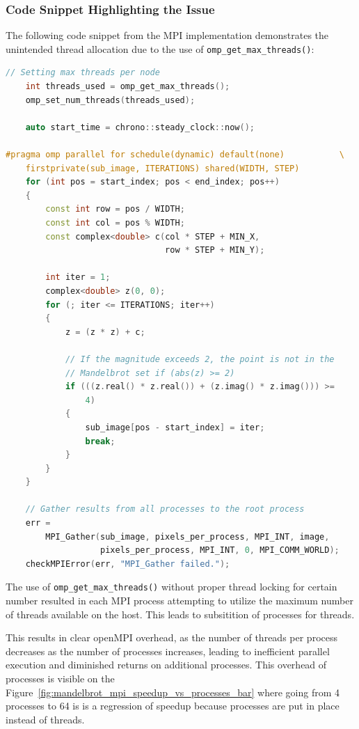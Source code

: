 \documentclass[
	report, %
	11pt, %
]{CSUniSchoolLabReport}
\newcounter{ct}
\begin{document}
\subsubsection{Code Snippet Highlighting the Issue}

The following code snippet from the MPI implementation demonstrates the unintended thread allocation due to the use of \texttt{omp\_get\_max\_threads()}:

\begin{lstlisting}[language=C++, caption={MPI Mandelbrot Kernel Launch with Thread Mismanagement}, label={lst:mandelbrot_mpi_code}]
	// Setting max threads per node
	int threads_used = omp_get_max_threads();
	omp_set_num_threads(threads_used);

	auto start_time = chrono::steady_clock::now();

#pragma omp parallel for schedule(dynamic) default(none)           \
	firstprivate(sub_image, ITERATIONS) shared(WIDTH, STEP)
	for (int pos = start_index; pos < end_index; pos++)
	{
		const int row = pos / WIDTH;
		const int col = pos % WIDTH;
		const complex<double> c(col * STEP + MIN_X,
								row * STEP + MIN_Y);

		int iter = 1;
		complex<double> z(0, 0);
		for (; iter <= ITERATIONS; iter++)
		{
			z = (z * z) + c;

			// If the magnitude exceeds 2, the point is not in the
			// Mandelbrot set if (abs(z) >= 2)
			if (((z.real() * z.real()) + (z.imag() * z.imag())) >=
				4)
			{
				sub_image[pos - start_index] = iter;
				break;
			}
		}
	}

	// Gather results from all processes to the root process
	err =
		MPI_Gather(sub_image, pixels_per_process, MPI_INT, image,
				   pixels_per_process, MPI_INT, 0, MPI_COMM_WORLD);
	checkMPIError(err, "MPI_Gather failed.");
\end{lstlisting}

The use of \texttt{omp\_get\_max\_threads()} without proper thread locking for certain number resulted in each MPI process attempting to utilize the maximum number of threads available on the host. This leads to subsitition of processes for threads.

This results in clear openMPI overhead, as the number of threads per process decreases as the number of processes increases, leading to inefficient parallel execution and diminished returns on additional processes. This overhead of processes is visible on the Figure~\ref{fig:mandelbrot_mpi_speedup_vs_processes_bar} where going from 4 processes to 64 is is a regression of speedup because processes are put in place instead of threads.
\end{document}

